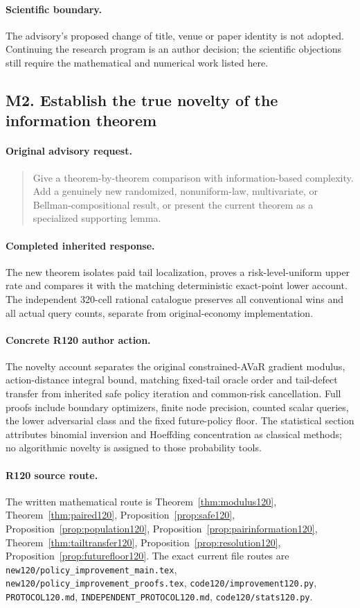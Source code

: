 \paragraph{Scientific boundary.}
The advisory's proposed change of title, venue or paper identity is not adopted. Continuing the research program is an author decision; the scientific objections still require the mathematical and numerical work listed here.

\subsection{M2. Establish the true novelty of the information theorem}
\label{response120:M2}
\paragraph{Original advisory request.}
\begin{quote}
Give a theorem-by-theorem comparison with information-based complexity. Add a genuinely new randomized, nonuniform-law, multivariate, or Bellman-compositional result, or present the current theorem as a specialized supporting lemma.
\end{quote}
\paragraph{Completed inherited response.}
The new theorem isolates paid tail localization, proves a risk-level-uniform upper rate and compares it with the matching deterministic exact-point lower account. The independent 320-cell rational catalogue preserves all conventional wins and all actual query counts, separate from original-economy implementation.
\paragraph{Concrete R120 author action.}
The novelty account separates the original constrained-AVaR gradient modulus, action-distance integral bound, matching fixed-tail oracle order and tail-defect transfer from inherited safe policy iteration and common-risk cancellation. Full proofs include boundary optimizers, finite node precision, counted scalar queries, the lower adversarial class and the fixed future-policy floor. The statistical section attributes binomial inversion and Hoeffding concentration as classical methods; no algorithmic novelty is assigned to those probability tools.
\paragraph{R120 source route.}
The written mathematical route is Theorem~\ref{thm:modulus120}, Theorem~\ref{thm:paired120}, Proposition~\ref{prop:safe120}, Proposition~\ref{prop:population120}, Proposition~\ref{prop:pairinformation120}, Theorem~\ref{thm:tailtransfer120}, Proposition~\ref{prop:resolution120}, Proposition~\ref{prop:futurefloor120}. The exact current file routes are \nolinkurl{new120/policy_improvement_main.tex}, \nolinkurl{new120/policy_improvement_proofs.tex}, \nolinkurl{code120/improvement120.py}, \nolinkurl{PROTOCOL120.md}, \nolinkurl{INDEPENDENT_PROTOCOL120.md}, \nolinkurl{code120/stats120.py}.
